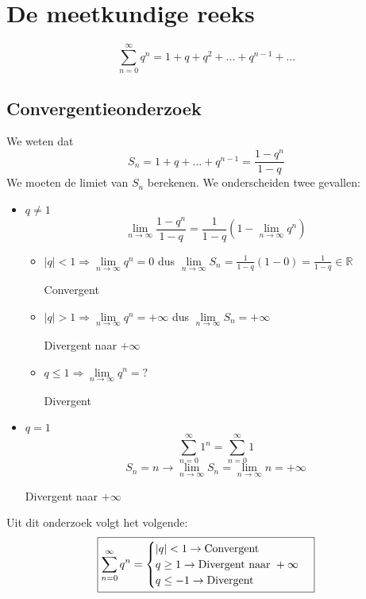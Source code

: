 \section{De meetkundige reeks}
$$\sum_{n = 0}^{\infty} q^n = 1 + q + q^2 + ... + q^{n - 1} + ...$$
\subsection{Convergentieonderzoek}
We weten dat 
$$S_n = 1 + q + ... + q^{n - 1} = \frac{1 - q^n}{1 - q}$$
We moeten de limiet van $S_n$ berekenen. We onderscheiden twee gevallen:
\begin{itemize}
 \item $q \neq 1$
    $$\lim\limits_{n\to\infty}\frac{1 - q^n}{1 - q} = \frac{1}{1 - q}(1 - \lim\limits_{n\to\infty} q^n)$$
    \begin{itemize}[label={als}]
      \item $|q| < 1 \Rightarrow \lim\limits_{n\to\infty} q^n = 0$
            dus
            $\lim\limits_{n\to\infty} S_n = \frac{1}{1 - q}(1 - 0) = \frac{1}{1 - q} \in \mathbb{R}$
            
            Convergent
      \item $|q| > 1 \Rightarrow \lim\limits_{n\to\infty} q^n = +\infty$
            dus
            $\lim\limits_{n\to\infty} S_n = +\infty$
            
            Divergent naar $+\infty$
      \item $q \leq 1 \Rightarrow \lim\limits_{n\to\infty} q^n = ?$
      
            Divergent
    \end{itemize}
 \item $q = 1$
    $$\sum_{n = 0}^{\infty} 1^n = \sum_{n = 0}^{\infty} 1$$
    $$S_n = n \rightarrow \lim\limits_{n\to\infty} S_n = \lim\limits_{n\to\infty} n = +\infty$$
    
    Divergent naar $+\infty$
\end{itemize}

Uit dit onderzoek volgt het volgende:
$$
\boxed{
    \sum_{n = 0}^{\infty} q^n = \begin{cases}
                            |q| < 1 \rightarrow \hbox{Convergent} \\
                            q \geq 1 \rightarrow \hbox{Divergent naar } +\infty \\
                            q \leq -1 \rightarrow \hbox{Divergent}
                            \end{cases}
}
$$

